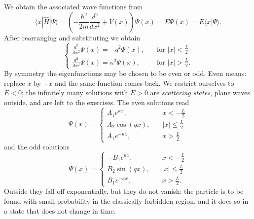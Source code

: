 We obtain the associated wave functions from
\begin{equation}
	\langle x|\widehat{H}|\Psi\rangle = \left(-\frac{\hbar^2}{2m}\frac{d^2}{dx^2} + V(x)\right)\Psi(x) = E\Psi(x) = E\langle x|\Psi\rangle.
\end{equation}
After rearranging and substituting we obtain
\begin{equation}
	\begin{cases}
		\frac{d^2}{dx^2}\Psi(x) = -q^2 \Psi(x), \quad &\text{for $|x|<\frac{L}{2}$}\\
		\frac{d^2}{dx^2}\Psi(x) = \kappa^2 \Psi(x), \quad &\text{for $|x|>\frac{L}{2}$}.
	\end{cases}
\end{equation}
By symmetry the eigenfunctions may be chosen to be even or odd. Even means: replace $x$ by $-x$ and the same function comes back. We restrict ourselves to $E<0$; the infinitely many solutions with $E>0$ are \emph{scattering states}, plane waves outside, and are left to the exercises. The even solutions read
\begin{equation}
	\Psi(x) = \begin{cases}
		A_1 e^{\kappa x}, \quad & x< -\frac{L}{2} \\
		A_2 \cos(qx), \quad & |x| \le \frac{L}{2} \\
		A_1 e^{-\kappa x}, \quad & x> \frac{L}{2}
	\end{cases}
\end{equation}
and the odd solutions
\begin{equation}
	\Psi(x) = \begin{cases}
		-B_1 e^{\kappa x}, \quad & x< -\frac{L}{2} \\
		B_2 \sin(qx), \quad & |x| \le \frac{L}{2} \\
		B_1 e^{-\kappa x}, \quad & x> \frac{L}{2}.
	\end{cases}
\end{equation}
Outside they fall off exponentially, but they do not vanish: the particle is to be found with small probability in the classically forbidden region, and it does so in a state that does not change in time.

